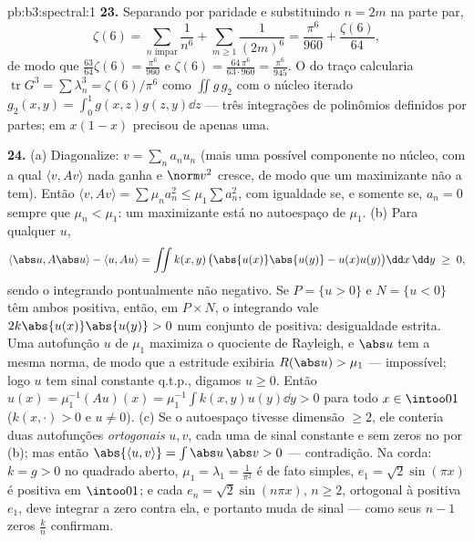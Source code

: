 \begin{solution}{pb:b3:spectral:1}
\textbf{23.} Separando por paridade e substituindo $n = 2m$
na parte par,
\[
\zeta(6) = \sum_{n\text{ ímpar}}\frac1{n^6} +
\sum_{m\geq1}\frac1{(2m)^6}
= \frac{\pi^6}{960} + \frac{\zeta(6)}{64},
\]
de modo que $\frac{63}{64}\zeta(6) = \frac{\pi^6}{960}$ e $\zeta(6)
= \frac{64\,\pi^6}{63\cdot960} = \frac{\pi^6}{945}$. O
 do traço calcularia $\operatorname{tr}G^3 =
\sum\lambda_n^3 = \zeta(6)/\pi^6$ como $\iint g\,g_2$ com o
núcleo iterado $g_2(x,y) = \int_0^1g(x,z)g(z,y)\dd z$ ---
três integrações de polinômios definidos por partes;  em
$x(1-x)$ precisou de apenas uma.

\textbf{24.} (a) Diagonalize: $v = \sum_na_nu_n$ (mais uma
possível componente no núcleo, com a qual $\langle v, Av\rangle$
nada ganha e $\norm v^2$ cresce, de modo que um maximizante não a
tem). Então $\langle v, Av\rangle = \sum\mu_na_n^2 \leq
\mu_1\sum a_n^2$, com igualdade se, e somente se, $a_n = 0$ sempre que
$\mu_n < \mu_1$: um maximizante está no
autoespaço de $\mu_1$. (b) Para qualquer $u$,
\[
\langle\abs u, A\abs u\rangle - \langle u, Au\rangle
= \iint k(x,y)\,\bigl(\abs{u(x)}\abs{u(y)} -
u(x)u(y)\bigr)\dd x\,\dd y \;\geq\; 0,
\]
sendo o integrando pontualmente não negativo. Se $P = \{u >
0\}$ e $N = \{u < 0\}$ têm ambos  positiva, então, em
$P\times N$, o integrando vale $2k\abs{u(x)}\abs{u(y)} >
0$ num conjunto de  positiva: desigualdade estrita. Uma
autofunção $u$ de $\mu_1$ maximiza o quociente de Rayleigh,
e $\abs u$ tem a mesma norma, de modo que a estritude exibiria
$R(\abs u) > \mu_1$ --- impossível; logo $u$ tem sinal
constante q.t.p., digamos $u \geq 0$. Então $u(x) = \mu_1^{-1}(Au)(x) =
\mu_1^{-1}\int k(x,y)u(y)\dd y > 0$ para todo $x \in
\intoo01$ ($k(x,\cdot) > 0$ e $u \neq 0$). (c) Se o
autoespaço tivesse dimensão $\geq 2$, ele conteria duas
autofunções \emph{ortogonais} $u, v$, cada uma de sinal
constante e sem zeros no  por (b); mas então
$\abs{\langle u, v\rangle} = \int\abs u\,\abs v > 0$ ---
contradição. Na corda: $k = g > 0$ no quadrado aberto,
$\mu_1 = \lambda_1 = \frac1{\pi^2}$ é de fato
simples, $e_1 = \sqrt2\sin(\pi x)$ é positiva em
$\intoo01$; e cada $e_n = \sqrt2\sin(n\pi x)$, $n \geq 2$,
ortogonal à positiva $e_1$, deve integrar a zero
contra ela, e portanto muda de sinal --- como seus $n - 1$ zeros
 $\frac kn$ confirmam.


\end{solution}
